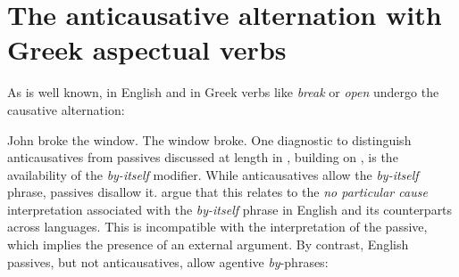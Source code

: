 \documentclass[output=paper]{langscibook}
\begin{document}
\section{The anticausative alternation with Greek aspectual verbs}

As is well known, in English and in Greek verbs like \textit{break} or \textit{open} undergo the causative alternation:

\ea%
    \label{alexiadouex:key:3}
    \ea John broke the window.
    \ex The window broke.
    \z 
\ex%
    \label{alexiadouex:key:4}
    \z 
\z
One diagnostic to distinguish anticausatives from passives discussed at length in \citet{AlexiadouAnagnostopoulouSchafer2015}, 
building on \citet{LevinRappaportHovav1995}, is the availability of the \textit{by-itself} modifier. 
While anticausatives allow the \textit{by-itself} phrase, passives disallow it. 
\citet{AlexiadouAnagnostopoulouSchafer2015} argue that this relates to the \textit{no particular cause} interpretation 
associated with the \textit{by-itself} phrase in English and its counterparts across languages. 
This is incompatible with the interpretation of the passive, which implies the presence of an external argument. 
By contrast, English passives, but not anticausatives, allow agentive \textit{by}-phrases:
\largerpage
\end{document}
